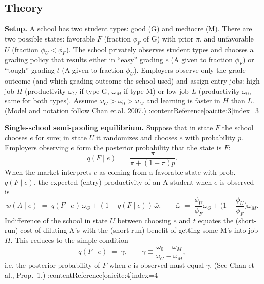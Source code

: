 \subsection{Theory}
\noindent\textbf{Setup.} A school has two student types: good (G) and mediocre (M). There are two possible states: favorable \(F\) (fraction \(\phi_F\) of G) with prior \(\pi\), and unfavorable \(U\) (fraction \(\phi_U<\phi_F\)). The school privately observes student types and chooses a grading policy that results either in ``easy'' grading \(e\) (A given to fraction \(\phi_F\)) or ``tough'' grading \(t\) (A given to fraction \(\phi_U\)). Employers observe only the grade outcome (and which grading outcome the school used) and assign entry jobs: high job \(H\) (productivity \(\omega_G\) if type G, \(\omega_M\) if type M) or low job \(L\) (productivity \(\omega_0\), same for both types). Assume \(\omega_G>\omega_0>\omega_M\) and learning is faster in \(H\) than \(L\). (Model and notation follow Chan et\,al. 2007.) :contentReference[oaicite:3]{index=3}

\medskip
\noindent\textbf{Single-school semi-pooling equilibrium.}  
Suppose that in state \(F\) the school chooses \(e\) for sure; in state \(U\) it randomizes and chooses \(e\) with probability \(p\). Employers observing \(e\) form the posterior probability that the state is \(F\):
\begin{equation}
q(F\mid e)\;=\;\frac{\pi}{\pi+(1-\pi)p}. \label{eq:qFe}
\end{equation}
When the market interprets \(e\) as coming from a favorable state with prob.\ \(q(F\mid e)\), the expected (entry) productivity of an A-student when \(e\) is observed is
\begin{equation}
w(A\mid e)\;=\;q(F\mid e)\,\omega_G+(1-q(F\mid e))\,\bar\omega,
\qquad
\bar\omega \;=\; \frac{\phi_U}{\phi_F}\omega_G+\Big(1-\frac{\phi_U}{\phi_F}\Big)\omega_M. \label{eq:wA}
\end{equation}
Indifference of the school in state \(U\) between choosing \(e\) and \(t\) equates the (short-run) cost of diluting A’s with the (short-run) benefit of getting some M’s into job \(H\). This reduces to the simple condition
\begin{equation}
q(F\mid e)\;=\;\gamma,\qquad
\gamma\equiv\frac{\omega_0-\omega_M}{\omega_G-\omega_M}, \label{eq:qgamma}
\end{equation}
i.e. the posterior probability of \(F\) when \(e\) is observed must equal \(\gamma\). (See Chan et\,al., Prop.\ 1.) :contentReference[oaicite:4]{index=4}

